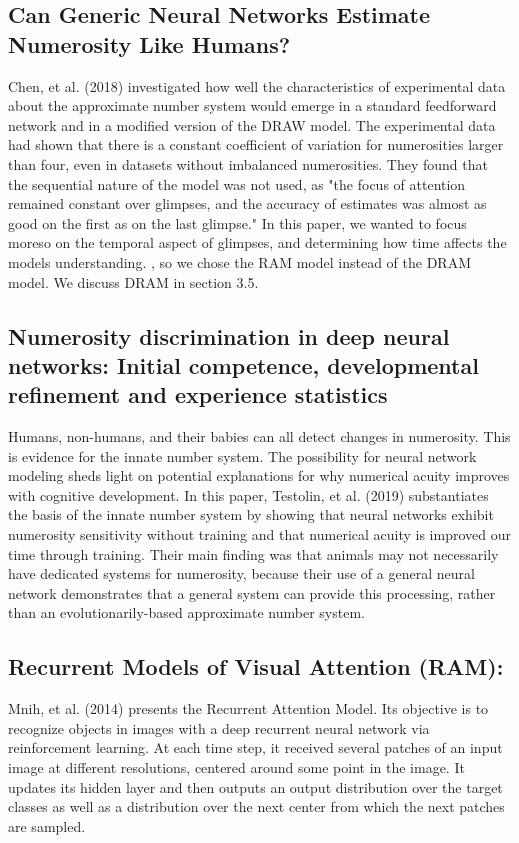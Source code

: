 \documentclass{article}
\begin{document}
\subsection{Can Generic Neural Networks Estimate Numerosity Like Humans?}
Chen, et al. (2018) \cite{mcclelland} investigated how well the characteristics of experimental data about the approximate number system would emerge in a standard feedforward network and in a modified version of the DRAW  model. The experimental data had shown that there is a constant coefficient of variation for numerosities larger than four, even in datasets without imbalanced numerosities. They found that the sequential nature of the model was not used, as "the focus of attention remained constant over
glimpses, and the accuracy of estimates was almost as good
on the first as on the last glimpse."\newline
In this paper, we wanted to focus moreso on the temporal aspect of glimpses, and determining how time affects the models understanding. , so we chose the RAM model instead of the DRAM model. We discuss DRAM in section 3.5.



\subsection{Numerosity discrimination in deep neural networks: Initial
competence, developmental refinement and experience
statistics}
Humans, non-humans, and their babies can all detect changes in numerosity. This is evidence for the innate number system. The possibility for neural network modeling sheds light on potential explanations for why numerical acuity improves with cognitive development. In this paper, Testolin, et al. (2019) \cite{competence} substantiates the basis of the innate number system by showing that neural networks exhibit numerosity sensitivity without training and that numerical acuity is improved our time through training. Their main finding was that animals may not necessarily have dedicated systems for numerosity, because their use of a general neural network demonstrates that a general system can provide this processing, rather than an evolutionarily-based approximate number system.


\subsection{Recurrent Models of Visual Attention (RAM): }
Mnih, et al. (2014) \cite{deepmind} presents the Recurrent Attention Model. Its objective is to recognize objects in images with a deep recurrent neural network via reinforcement learning. At each time step, it received several patches of an input image at different resolutions, centered around some point in the image. It updates its hidden layer and then outputs an output distribution over the target classes as well as a distribution over the next center from which the next patches are sampled.
\end{document}
